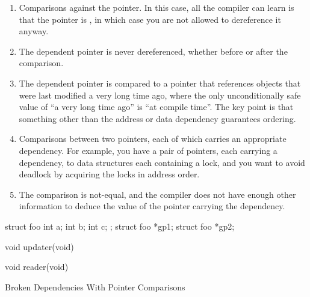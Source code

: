 \begin{enumerate}
\item	Comparisons against the  pointer.
	In this case, all the compiler can learn is that the pointer
	is , in which case you are not allowed to
	dereference it anyway.
\item	The dependent pointer is never dereferenced, whether before or
	after the comparison.
\item	The dependent pointer is compared to a pointer that references
	objects that were last modified a very long time ago, where
	the only unconditionally safe value of ``a very long time ago'' is
	``at compile time''.
	The key point is that something other than the address or data
	dependency guarantees ordering.
\item	Comparisons between two pointers, each of which carries
	an appropriate dependency.
	For example, you have a pair of pointers, each carrying a
	dependency, to data structures each containing a lock, and you
	want to avoid deadlock by acquiring the locks in address order.
\item	The comparison is not-equal, and the compiler does not have
	enough other information to deduce the value of the
	pointer carrying the dependency.
\end{enumerate}

\begin{listing}
\begin{fcvlabel}
\begin{VerbatimL}[commandchars=\\\[\]]
struct foo {		\lnlbl[foo:b]
	int a;
	int b;
	int c;
};                      \lnlbl[foo:e]
struct foo *gp1;	\lnlbl[gp1]
struct foo *gp2;	\lnlbl[gp2]

void updater(void)						\lnlbl[upd:e]

void reader(void)						\lnlbl[read:e]
\end{VerbatimL}
\end{fcvlabel}
\caption{Broken Dependencies With Pointer Comparisons}
\label{lst:memorder:Broken Dependencies With Pointer Comparisons}
\end{listing}

